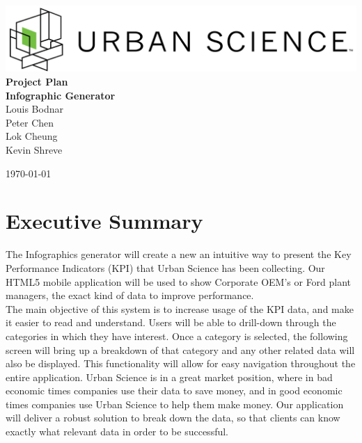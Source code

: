 \documentclass[11pt,a4paper,oneside]{article}
\begin{document}
\begin{titlepage}

\begin{center}

\includegraphics[width=1\textwidth]{images/sponsor-logo.png}\\[1cm]    

{ \huge \bfseries Project Plan}\\[0.4cm]
{ \large \bfseries Infographic Generator}\\[0.4cm]

Louis Bodnar\\
Peter Chen\\
Lok Cheung\\
Kevin Shreve\\



\vfill

{\large \today}

\end{center}

\end{titlepage}

\tableofcontents

\newpage

\section{Executive Summary}


The Infographics generator will create a new an intuitive way to present the Key Performance Indicators (KPI) that Urban Science has been collecting. Our HTML5 mobile application will be used to show Corporate OEM’s or Ford plant managers, the exact kind of data to improve performance.\\

The main objective of this system is to increase usage of the KPI data, and make it easier to read and understand. Users will be able to drill-down through the categories in which they have interest. Once a category is selected, the following screen will bring up a breakdown of that category and any other related data will also be displayed. This functionality will allow for easy navigation throughout the entire application. Urban Science is in a great market position, where in bad economic times companies use their data to save money, and in good economic times companies use Urban Science to help them make money. Our application will deliver a robust solution to break down the data, so that clients can know exactly what relevant data in order to be successful.\\
\end{document}
